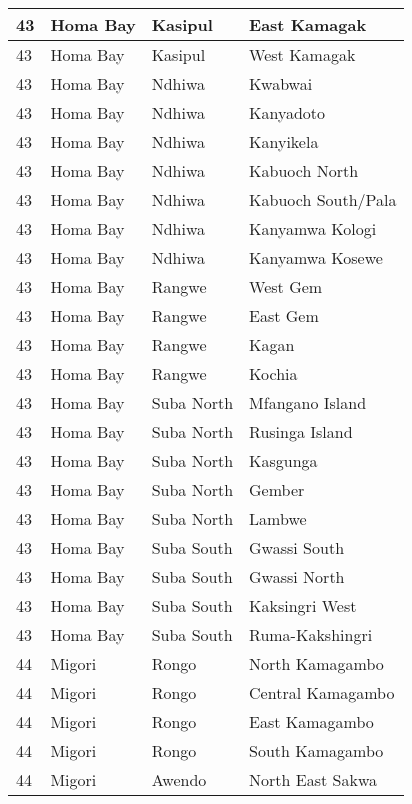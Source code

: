 \begin{table}[!ht]
\begin{tabular}{|l|l|l|l|}
        43 & Homa Bay & Kasipul & East Kamagak \\ \hline
        43 & Homa Bay & Kasipul & West Kamagak \\ \hline
        43 & Homa Bay & Ndhiwa & Kwabwai \\ \hline
        43 & Homa Bay & Ndhiwa & Kanyadoto \\ \hline
        43 & Homa Bay & Ndhiwa & Kanyikela \\ \hline
        43 & Homa Bay & Ndhiwa & Kabuoch North \\ \hline
        43 & Homa Bay & Ndhiwa & Kabuoch South/Pala \\ \hline
        43 & Homa Bay & Ndhiwa & Kanyamwa Kologi \\ \hline
        43 & Homa Bay & Ndhiwa & Kanyamwa Kosewe \\ \hline
        43 & Homa Bay & Rangwe & West Gem \\ \hline
        43 & Homa Bay & Rangwe & East Gem \\ \hline
        43 & Homa Bay & Rangwe & Kagan \\ \hline
        43 & Homa Bay & Rangwe & Kochia \\ \hline
        43 & Homa Bay & Suba North & Mfangano Island \\ \hline
        43 & Homa Bay & Suba North & Rusinga Island \\ \hline
        43 & Homa Bay & Suba North & Kasgunga \\ \hline
        43 & Homa Bay & Suba North & Gember \\ \hline
        43 & Homa Bay & Suba North & Lambwe \\ \hline
        43 & Homa Bay & Suba South & Gwassi South \\ \hline
        43 & Homa Bay & Suba South & Gwassi North \\ \hline
        43 & Homa Bay & Suba South & Kaksingri West \\ \hline
        43 & Homa Bay & Suba South & Ruma-Kakshingri \\ \hline
        44 & Migori & Rongo & North Kamagambo \\ \hline
        44 & Migori & Rongo & Central Kamagambo \\ \hline
        44 & Migori & Rongo & East Kamagambo \\ \hline
        44 & Migori & Rongo & South Kamagambo \\ \hline
        44 & Migori & Awendo & North East Sakwa \\ \hline

\end{tabular}
\end{table}
